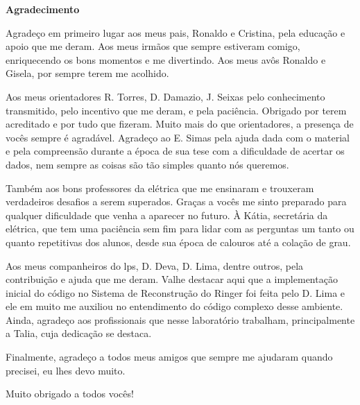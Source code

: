\cleardoublepage

\begin{center}
\textbf{\Large Agradecimento}
\end{center}

Agradeço em primeiro lugar aos meus pais, Ronaldo e Cristina, 
pela educação e apoio que me deram. Aos meus irmãos que sempre
estiveram comigo, enriquecendo os bons momentos e me divertindo. Aos meus 
avôs Ronaldo e Gisela, por sempre terem me acolhido.

Aos meus orientadores R. Torres, D. Damazio, J. Seixas pelo conhecimento
transmitido, pelo incentivo que me deram, e pela paciência. Obrigado 
por terem acreditado e por tudo que fizeram. Muito mais do que
orientadores, a presença de vocês sempre é agradável. Agradeço ao E. Simas pela
ajuda dada com o material e pela compreensão durante a época de sua tese com a
dificuldade de acertar os dados, nem sempre as coisas são tão simples quanto nós
queremos.

Também aos bons professores da elétrica que me ensinaram e trouxeram 
verdadeiros desafios a serem superados. Graças a vocês me sinto preparado para
qualquer dificuldade que venha a aparecer no futuro.
À Kátia, secretária da elétrica, que tem uma paciência sem fim para lidar com as
perguntas um tanto ou quanto repetitivas dos alunos, desde sua época de calouros
até a colação de grau. 

Aos meus companheiros do \acrshort{lps}, D. Deva, D. Lima, 
dentre outros, pela contribuição e ajuda que me deram. Valhe destacar aqui que a
implementação inicial do código no Sistema de Reconstrução do Ringer foi feita pelo D. Lima
e ele em muito me auxiliou no entendimento do código complexo desse ambiente. 
Ainda, agradeço aos profissionais que nesse 
laboratório trabalham, principalmente a Talia, cuja dedicação se destaca.

Finalmente, agradeço a todos meus amigos que sempre me ajudaram quando precisei, 
eu lhes devo muito.

Muito obrigado a todos vocês!
